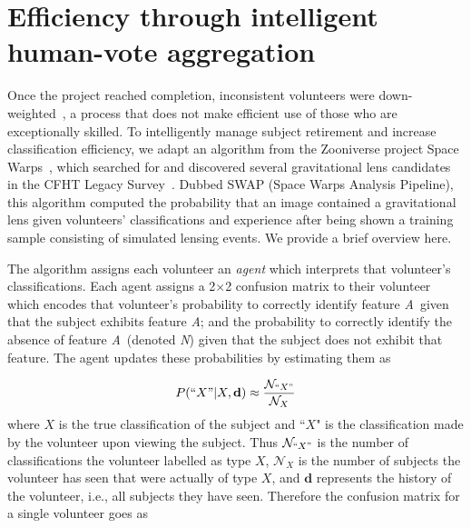 \documentclass[twocolumn,  trackchanges, ]{aastex6}%
\newcommand{\A}{\textit{A}}
\newcommand{\N}{\textit{N}}
\begin{document}
\section{Efficiency through intelligent human-vote aggregation}\label{sec: SWAP}
 Once the project reached completion, inconsistent volunteers were down-weighted~\citep{Willett2013}, a process that does not make efficient use of those who are exceptionally skilled. To intelligently manage subject retirement and increase classification efficiency, we adapt an algorithm from the Zooniverse  project Space Warps~\citep{Marshall2016}, which searched for and discovered several gravitational lens candidates in the CFHT Legacy Survey~\citep{More2016}.  Dubbed SWAP (Space Warps Analysis Pipeline), this algorithm computed the probability that an image contained a gravitational lens given volunteers' classifications and experience after being shown a training sample consisting of simulated lensing events.  We provide a brief overview here.  

The algorithm assigns each volunteer an \textit{agent} which interprets that volunteer's classifications. Each agent assigns a 2$\times$2 confusion matrix to their volunteer which encodes that volunteer's probability to correctly identify feature \A~given that the subject exhibits feature \A; and the probability to correctly identify the absence of feature \A~(denoted \N) given that the subject does not exhibit that feature. The agent updates these probabilities by estimating them as 

\begin{equation}
P(``X" | X, \mathbf{d}) \approx \frac{\mathcal{N}_{``X"}}{\mathcal{N}_{X}}
\end{equation}
where $X$ is the true classification of the subject and ``$X$" is the  classification made by the volunteer upon viewing the subject. Thus $\mathcal{N}_{``X"}$ is the number of classifications the volunteer labelled as type $X$, $\mathcal{N}_X$ is the number of subjects the volunteer has seen that were actually of type $X$, and $\mathbf{d}$ represents the history of the volunteer, i.e., all subjects they have seen. Therefore the confusion matrix for a single volunteer goes as
\end{document}
